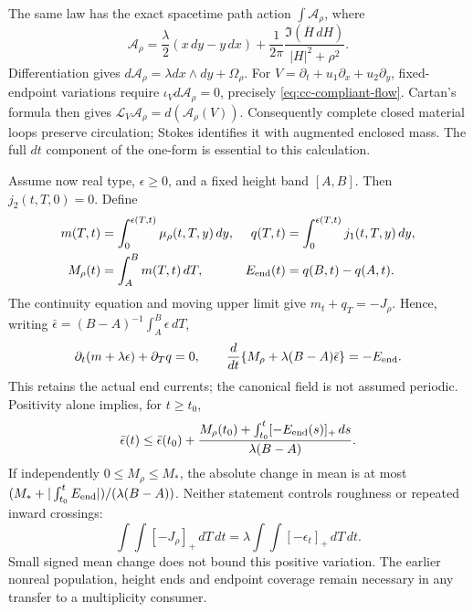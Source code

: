 The same law has the exact spacetime path action $\int\mathcal A_\rho$,
where
\begin{equation}
 \mathcal A_\rho=\frac\lambda2(x\,dy-y\,dx)
 +\frac1{2\pi}\frac{\Im(\overline H\,dH)}{|H|^2+\rho^2}.
 \label{eq:cc-scalar-action}
\end{equation}
Differentiation gives
$d\mathcal A_\rho=\lambda dx\wedge dy+\Omega_\rho$.
For $V=\partial_t+u_1\partial_x+u_2\partial_y$, fixed-endpoint
variations require $\iota_Vd\mathcal A_\rho=0$, precisely
\eqref{eq:cc-compliant-flow}.  Cartan's formula then gives
$\mathcal L_V\mathcal A_\rho=d(\mathcal A_\rho(V))$.
Consequently complete closed material loops preserve circulation;
Stokes identifies it with augmented enclosed mass.  The full $dt$
component of the one-form is essential to this calculation.

Assume now real type, $\epsilon\ge0$, and a fixed height band $[A,B]$.
Then $j_2(t,T,0)=0$.  Define
\begin{align*}
 m(T,t)&=\int_0^{\epsilon(T,t)}\mu_\rho(t,T,y)\,dy,&
 q(T,t)&=\int_0^{\epsilon(T,t)}j_1(t,T,y)\,dy,\\
 M_\rho(t)&=\int_A^B m(T,t)\,dT,&
 E_{\rm end}(t)&=q(B,t)-q(A,t).
\end{align*}
The continuity equation and moving upper limit give
$m_t+q_T=-J_\rho$.  Hence, writing
$\bar\epsilon=(B-A)^{-1}\int_A^B\epsilon\,dT$,
\begin{equation}
 \partial_t(m+\lambda\epsilon)+\partial_Tq=0,
 \qquad
 \frac d{dt}\{M_\rho+\lambda(B-A)\bar\epsilon\}=-E_{\rm end}.
 \label{eq:cc-mean-balance}
\end{equation}
This retains the actual end currents; the canonical field is not
assumed periodic.  Positivity alone implies, for $t\ge t_0$,
\begin{equation}
 \bar\epsilon(t)\le\bar\epsilon(t_0)+
 \frac{M_\rho(t_0)+\int_{t_0}^t[-E_{\rm end}(s)]_+\,ds}
      {\lambda(B-A)}.
 \label{eq:cc-mean-bound}
\end{equation}
If independently $0\le M_\rho\le M_*$, the absolute change in mean is
at most $(M_*+|\int_{t_0}^tE_{\rm end}|)/(\lambda(B-A))$.
Neither statement controls roughness or repeated inward crossings:
\begin{equation}
 \int\!\int[-J_\rho]_+\,dT\,dt
 =\lambda\int\!\int[-\epsilon_t]_+\,dT\,dt.
 \label{eq:cc-one-sided-variation}
\end{equation}
Small signed mean change does not bound this positive variation.
The earlier nonreal population, height ends and endpoint coverage
remain necessary in any transfer to a multiplicity consumer.

